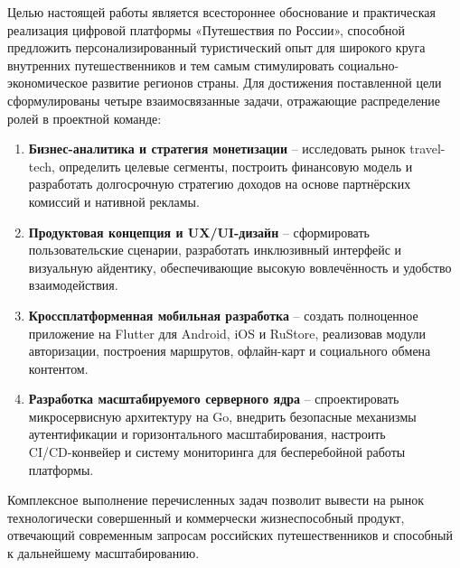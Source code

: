 Целью настоящей работы является всестороннее обоснование и практическая реализация цифровой платформы «Путешествия по России», способной предложить персонализированный туристический опыт для широкого круга внутренних путешественников и тем самым стимулировать социально-экономическое развитие регионов страны.
Для достижения поставленной цели сформулированы четыре взаимосвязанные задачи, отражающие распределение ролей в проектной команде:
\begin{enumerate}
    \item \textbf{Бизнес-аналитика и стратегия монетизации} – исследовать рынок travel-tech, определить целевые сегменты, построить финансовую модель и разработать долгосрочную стратегию доходов на основе партнёрских комиссий и нативной рекламы.
    \item \textbf{Продуктовая концепция и UX/UI-дизайн} – сформировать пользовательские сценарии, разработать инклюзивный интерфейс и визуальную айдентику, обеспечивающие высокую вовлечённость и удобство взаимодействия.
    \item \textbf{Кроссплатформенная мобильная разработка} – создать полноценное приложение на Flutter для Android, iOS и RuStore, реализовав модули авторизации, построения маршрутов, офлайн-карт и социального обмена контентом.
    \item \textbf{Разработка масштабируемого серверного ядра} – спроектировать микросервисную архитектуру на Go, внедрить безопасные механизмы аутентификации и горизонтального масштабирования, настроить \\ CI/CD-конвейер и систему мониторинга для бесперебойной работы платформы.
\end{enumerate}

\noindent Комплексное выполнение перечисленных задач позволит вывести на рынок технологически совершенный и коммерчески жизнеспособный продукт, отвечающий современным запросам российских путешественников и способный к дальнейшему масштабированию.

